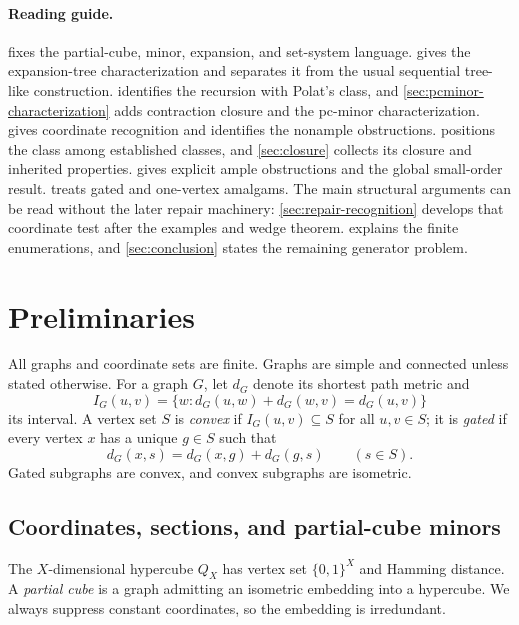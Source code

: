 \documentclass[11pt]{article}
\theoremstyle{definition}
\theoremstyle{remark}
\newcommand{\bits}{\{0,1\}}
\begin{document}
\paragraph{Reading guide.}
 fixes the partial-cube, minor, expansion, and
set-system language.   gives the
expansion-tree characterization and separates it from the usual sequential
tree-like construction.   identifies the recursion with Polat's
class, and \cref{sec:pcminor-characterization} adds contraction closure
and the pc-minor characterization.
 gives coordinate recognition and identifies the
nonample obstructions.   positions the
class among established classes, and \cref{sec:closure} collects its closure
and inherited properties.   gives explicit ample
obstructions and the global small-order result.   treats
gated and one-vertex amalgams.
The main structural arguments can be read without the later repair
machinery: \cref{sec:repair-recognition} develops that coordinate test after
the examples and wedge theorem.  explains the finite
enumerations, and \cref{sec:conclusion} states the remaining generator
problem.

\section{Preliminaries}
\label{sec:preliminaries}

All graphs and coordinate sets are finite.  Graphs are simple and connected
unless stated otherwise.  For a graph \(G\), let \(d_G\) denote its shortest
path metric and
\[
 I_G(u,v)=\{w:d_G(u,w)+d_G(w,v)=d_G(u,v)\}
\]
its interval.  A vertex set \(S\) is \emph{convex} if
\(I_G(u,v)\subseteq S\) for all \(u,v\in S\); it is \emph{gated} if every
vertex \(x\) has a unique \(g\in S\) such that
\[
 d_G(x,s)=d_G(x,g)+d_G(g,s)\qquad(s\in S).
\]
Gated subgraphs are convex, and convex subgraphs are isometric.

\subsection{Coordinates, sections, and partial-cube minors}

The \(X\)-dimensional hypercube \(Q_X\) has vertex set \(\bits^X\) and
Hamming distance.  A \emph{partial cube} is a graph admitting an isometric
embedding into a hypercube.  We always suppress constant coordinates, so the
embedding is irredundant.
\end{document}

